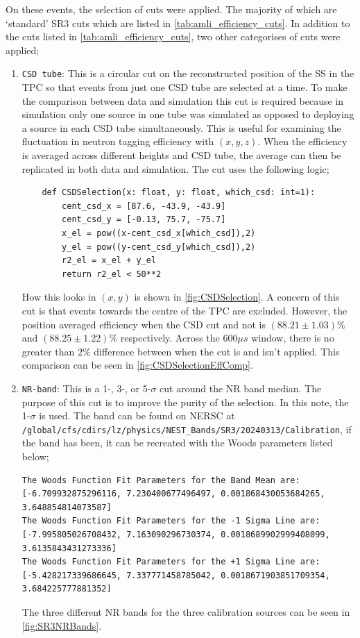 On these events, the selection of cuts were applied.
The majority of which are `standard' SR3 cuts which are listed in \autoref{tab:amli_efficiency_cuts}.
In addition to the cuts listed in \autoref{tab:amli_efficiency_cuts}, two other categorises of cuts were applied;
\begin{enumerate}
    \item \lstinline{CSD tube}: This is a circular cut on the reconstructed position of the SS in the TPC so that events from just one CSD tube are selected at a time. To make the comparison between data and simulation this cut is required because in simulation only one source in one tube was simulated as opposed to deploying a source in each CSD tube simultaneously. This is useful for examining the fluctuation in neutron tagging efficiency with $(x,y,z)$. When the efficiency is averaged across different heights and CSD tube, the average can then be replicated in both data and simulation.
    The cut uses the following logic;
    \begin{lstlisting}
    def CSDSelection(x: float, y: float, which_csd: int=1):
        cent_csd_x = [87.6, -43.9, -43.9]
        cent_csd_y = [-0.13, 75.7, -75.7]
        x_el = pow((x-cent_csd_x[which_csd]),2)
        y_el = pow((y-cent_csd_y[which_csd]),2)
        r2_el = x_el + y_el
        return r2_el < 50**2 
    \end{lstlisting}
    How this looks in $(x,y)$ is shown in \autoref{fig:CSDSelection}. 
    A concern of this cut is that events towards the centre of the TPC are excluded. 
    However, the position averaged efficiency when the CSD cut and not is $(88.21\pm1.03)\%$ and  $(88.25\pm1.22)\%$ respectively.
    Across the $600\mu s$ window, there is no greater than $2\%$ difference between when the cut is and isn't applied.
    This comparison can be seen in \autoref{fig:CSDSelectionEffComp}.
    \item \lstinline{NR-band}: This is a 1-, 3-, or 5-$\sigma$ cut around the NR band median. 
    The purpose of this cut is to improve the purity of the selection.
    In this note, the 1-$\sigma$ is used.
    The band can be found on NERSC at \lstinline{/global/cfs/cdirs/lz/physics/NEST_Bands/SR3/20240313/Calibration}, if the band has been, it can be recreated with the Woods parameters listed below;
    \begin{lstlisting}
The Woods Function Fit Parameters for the Band Mean are:  [-6.709932875296116, 7.230400677496497, 0.001868430053684265, 3.648854814073587]
The Woods Function Fit Parameters for the -1 Sigma Line are:  [-7.995805026708432, 7.163090296730374, 0.0018689902999408099, 3.6135843431273336]
The Woods Function Fit Parameters for the +1 Sigma Line are:  [-5.428217339686645, 7.337771458785042, 0.0018671903851709354, 3.684225777881352]
    \end{lstlisting}
    The three different NR bands for the three calibration sources can be seen in \autoref{fig:SR3NRBands}.
    \end{enumerate}


